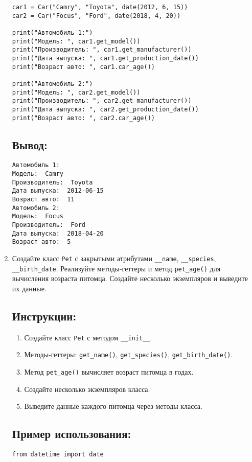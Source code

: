 \begin{enumerate}
\begin{lstlisting}[caption=Пример кода]
car1 = Car("Camry", "Toyota", date(2012, 6, 15))
car2 = Car("Focus", "Ford", date(2018, 4, 20))

print("Автомобиль 1:")
print("Модель: ", car1.get_model())
print("Производитель: ", car1.get_manufacturer())
print("Дата выпуска: ", car1.get_production_date())
print("Возраст авто: ", car1.car_age())

print("Автомобиль 2:")
print("Модель: ", car2.get_model())
print("Производитель: ", car2.get_manufacturer())
print("Дата выпуска: ", car2.get_production_date())
print("Возраст авто: ", car2.car_age())
\end{lstlisting}

\subsection*{Вывод:}
\begin{lstlisting}[caption=Ожидаемый вывод]
Автомобиль 1:
Модель:  Camry
Производитель:  Toyota
Дата выпуска:  2012-06-15
Возраст авто:  11
Автомобиль 2:
Модель:  Focus
Производитель:  Ford
Дата выпуска:  2018-04-20
Возраст авто:  5
\end{lstlisting}

\item
Создайте класс \texttt{Pet} с закрытыми атрибутами \texttt{\_\_name}, \texttt{\_\_species}, \texttt{\_\_birth\_date}. Реализуйте методы-геттеры и метод \texttt{pet\_age()} для вычисления возраста питомца. Создайте несколько экземпляров и выведите их данные.

\subsection*{Инструкции:}
\begin{enumerate}
    \item Создайте класс \texttt{Pet} с методом \texttt{\_\_init\_\_}.
    \item Методы-геттеры: \texttt{get\_name()}, \texttt{get\_species()}, \texttt{get\_birth\_date()}.
    \item Метод \texttt{pet\_age()} вычисляет возраст питомца в годах.
    \item Создайте несколько экземпляров класса.
    \item Выведите данные каждого питомца через методы класса.
\end{enumerate}

\subsection*{Пример использования:}
\begin{lstlisting}[caption=Пример кода]
from datetime import date


\end{lstlisting}
\end{enumerate}
